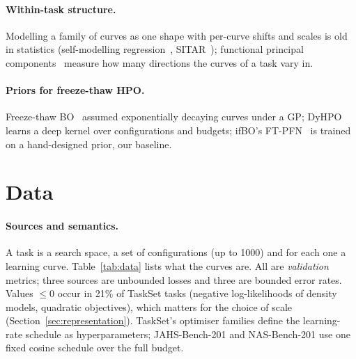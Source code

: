 \documentclass[10pt]{article}
\begin{document}
\paragraph{Within-task structure.} Modelling a family of curves as one shape with per-curve shifts and scales is
old in statistics (self-modelling regression~\cite{lawton1972self}, SITAR~\cite{cole2010sitar}); functional
principal components~\cite{ramsay2005functional} measure how many directions the curves of a task vary in.
\paragraph{Priors for freeze-thaw HPO.} Freeze-thaw BO~\cite{swersky2014freeze} assumed exponentially decaying
curves under a GP; DyHPO~\cite{wistuba2022supervising} learns a deep kernel over configurations and budgets; ifBO's
FT-PFN~\cite{rakotoarison2024incontext} is trained on a hand-designed prior, our baseline.

\section{Data}
\label{sec:data}

\paragraph{Sources and semantics.} A task is a search space, a set of configurations (up to 1000) and for each one
a learning curve. Table~\ref{tab:data} lists what the curves are. All are \emph{validation} metrics; three
sources are unbounded losses and three are bounded error rates. Values $\le 0$ occur in 21\% of TaskSet tasks
(negative log-likelihoods of density models, quadratic objectives), which matters for the choice of scale
(Section~\ref{sec:representation}). TaskSet's optimiser families define the learning-rate schedule as
hyperparameters; JAHS-Bench-201 and NAS-Bench-201 use one fixed cosine schedule over the full budget.
\end{document}
